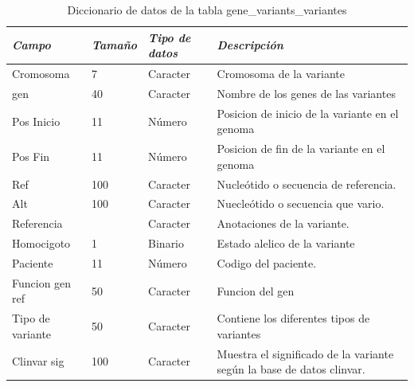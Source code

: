 \begin{table}[h!]
	\begin{tabular}{|l|l|l|p{7cm}|}
		\hline
		\textit{\textbf{Campo}} & \textit{\textbf{Tamaño}} & \textit{\textbf{Tipo de datos}} & \textit{\textbf{Descripción}}                                         \\ \hline
		Cromosoma               & 7                        & Caracter                        & Cromosoma de la variante                                              \\ \hline
		gen                     & 40                       & Caracter                        & Nombre de los genes de las variantes                                  \\ \hline
		Pos Inicio              & 11                       & Número                          & Posicion de inicio de la variante en el genoma                        \\ \hline
		Pos Fin                 & 11                       & Número                          & Posicion de fin de la variante en el genoma                           \\ \hline
		Ref                     & 100                      & Caracter                        & Nucleótido o secuencia de referencia.                                 \\ \hline
		Alt                     & 100                      & Caracter                        & Nuecleótido o secuencia que vario.                                    \\ \hline
		Referencia              &                          & Caracter                        & Anotaciones de la variante.                                           \\ \hline
		Homocigoto              & 1                        & Binario                         & Estado alelico de la variante                                         \\ \hline
		Paciente                & 11                       & Número                          & Codigo del paciente.                                                  \\ \hline
		Funcion gen ref         & 50                       & Caracter                        & Funcion del gen                                                       \\ \hline
		Tipo de variante        & 50                       & Caracter                        & Contiene los diferentes tipos de variantes                            \\ \hline
		Clinvar sig             & 100                      & Caracter                        & Muestra el significado de la variante según la base de datos clinvar. \\ \hline
	\end{tabular}
\caption{Diccionario de datos de la tabla gene\_variants\_variantes}
\label{tabla:datos1}
\end{table}


